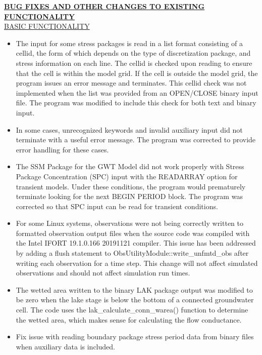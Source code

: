 	\textbf{\underline{BUG FIXES AND OTHER CHANGES TO EXISTING FUNCTIONALITY}} \\
	\underline{BASIC FUNCTIONALITY}
	\begin{itemize}
		\item The input for some stress packages is read in a list format consisting of a cellid, the form of which depends on the type of discretization package, and stress information on each line.  The cellid is checked upon reading to ensure that the cell is within the model grid.  If the cell is outside the model grid, the program issues an error message and terminates.  This cellid check was not implemented when the list was provided from an OPEN/CLOSE binary input file.  The program was modified to include this check for both text and binary input.
		\item In some cases, unrecognized keywords and invalid auxiliary input did not terminate with a useful error message. The program was corrected to provide error handling for these cases.
		\item The SSM Package for the GWT Model did not work properly with Stress Package Concentration (SPC) input with the READARRAY option for transient models.  Under these conditions, the program would prematurely terminate looking for the next BEGIN PERIOD block.  The program was corrected so that SPC input can be read for transient conditions.
		\item For some Linux systems, observations were not being correctly written to formatted observation output files when the source code was compiled with the Intel IFORT 19.1.0.166 20191121 compiler. This issue has been addressed by adding a flush statement to ObsUtilityModule::write\_unfmtd\_obs after writing each observation for a time step. This change will not affect simulated observations and should not affect simulation run times.
		\item The wetted area written to the binary LAK package output was modified to be zero when the lake stage is below the bottom of a connected groundwater cell.  The code uses the lak\_calculate\_conn\_warea() function to determine the wetted area, which makes sense for calculating the flow conductance.
		\item Fix issue with reading boundary package stress period data from binary files when auxiliary data is included.
	\end{itemize}

